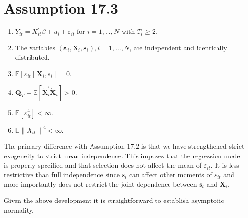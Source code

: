 \documentclass[10pt]{article}
\begin{document}
\section{Assumption 17.3}
\begin{enumerate}
  \item $Y_{i t}=X_{i t}^{\prime} \beta+u_{i}+\varepsilon_{i t}$ for $i=1, \ldots, N$ with $T_{i} \geq 2$.

  \item The variables $\left(\boldsymbol{\varepsilon}_{i}, \boldsymbol{X}_{i}, \boldsymbol{s}_{i}\right), i=1, \ldots, N$, are independent and identically distributed.

  \item $\mathbb{E}\left[\varepsilon_{i t} \mid \boldsymbol{X}_{i}, s_{i}\right]=0$.

  \item $\boldsymbol{Q}_{T}=\mathbb{E}\left[\dot{\boldsymbol{X}}_{i}^{\prime} \dot{\boldsymbol{X}}_{i}\right]>0$.

  \item $\mathbb{E}\left[\varepsilon_{i t}^{4}\right]<\infty$.

  \item $\mathbb{E}\left\|X_{i t}\right\|^{4}<\infty$.

\end{enumerate}
The primary difference with Assumption $17.2$ is that we have strengthened strict exogeneity to strict mean independence. This imposes that the regression model is properly specified and that selection does not affect the mean of $\varepsilon_{i t}$. It is less restrictive than full independence since $\boldsymbol{s}_{i}$ can affect other moments of $\varepsilon_{i t}$ and more importantly does not restrict the joint dependence between $\boldsymbol{s}_{i}$ and $\boldsymbol{X}_{i}$.

Given the above development it is straightforward to establish asymptotic normality.
\end{document}
